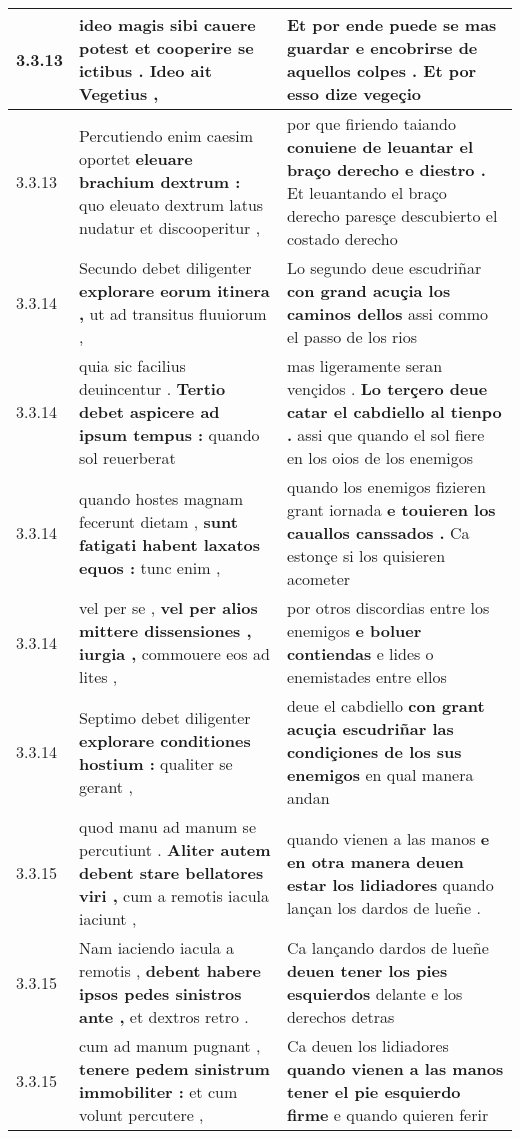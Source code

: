 \begin{tabular}{|p{1cm}|p{6.5cm}|p{6.5cm}|}
3.3.13 & ideo magis sibi cauere potest \textbf{ et cooperire se ictibus . } Ideo ait Vegetius , & Et por ende puede se mas guardar \textbf{ e encobrirse de aquellos colpes . } Et por esso dize vegeçio \\\hline
3.3.13 & Percutiendo enim caesim oportet \textbf{ eleuare brachium dextrum : } quo eleuato dextrum latus nudatur et discooperitur , & por que firiendo taiando \textbf{ conuiene de leuantar el braço derecho e diestro . } Et leuantando el braço derecho paresçe descubierto el costado derecho \\\hline
3.3.14 & Secundo debet diligenter \textbf{ explorare eorum itinera , } ut ad transitus fluuiorum , & Lo segundo deue escudriñar \textbf{ con grand acuçia los caminos dellos } assi commo el passo de los rios \\\hline
3.3.14 & quia sic facilius deuincentur . \textbf{ Tertio debet aspicere ad ipsum tempus : } quando sol reuerberat & mas ligeramente seran vençidos . \textbf{ Lo terçero deue catar el cabdiello al tienpo . } assi que quando el sol fiere en los oios de los enemigos \\\hline
3.3.14 & quando hostes magnam fecerunt dietam , \textbf{ sunt fatigati habent laxatos equos : } tunc enim , & quando los enemigos fizieren grant iornada \textbf{ e touieren los cauallos canssados . } Ca estonçe si los quisieren acometer \\\hline
3.3.14 & vel per se , \textbf{ vel per alios mittere dissensiones , iurgia , } commouere eos ad lites , & por otros discordias entre los enemigos \textbf{ e boluer contiendas } e lides o enemistades entre ellos \\\hline
3.3.14 & Septimo debet diligenter \textbf{ explorare conditiones hostium : } qualiter se gerant , & deue el cabdiello \textbf{ con grant acuçia escudriñar las condiçiones de los sus enemigos } en qual manera andan \\\hline
3.3.15 & quod manu ad manum se percutiunt . \textbf{ Aliter autem debent stare bellatores viri , } cum a remotis iacula iaciunt , & quando vienen a las manos \textbf{ e en otra manera deuen estar los lidiadores } quando lançan los dardos de lueñe . \\\hline
3.3.15 & Nam iaciendo iacula a remotis , \textbf{ debent habere ipsos pedes sinistros ante , } et dextros retro . & Ca lançando dardos de lueñe \textbf{ deuen tener los pies esquierdos } delante e los derechos detras \\\hline
3.3.15 & cum ad manum pugnant , \textbf{ tenere pedem sinistrum immobiliter : } et cum volunt percutere , & Ca deuen los lidiadores \textbf{ quando vienen a las manos tener el pie esquierdo firme } e quando quieren ferir \\\hline

\end{tabular}
